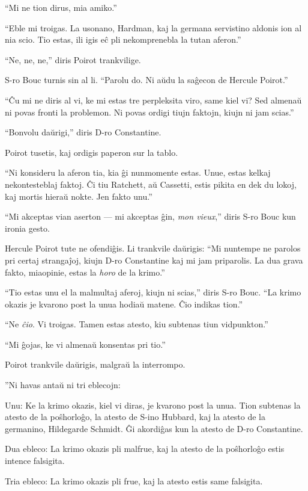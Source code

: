 ``Mi ne tion dirus, mia amiko.''

``Eble mi troigas. La usonano, Hardman, kaj la germana servistino aldonis ion al nia scio. Tio estas, ili igis eĉ pli nekomprenebla la tutan aferon.''

``Ne, ne, ne,'' diris Poirot trankvilige.

S-ro Bouc turnis sin al li. ``Parolu do. Ni aŭdu la saĝecon de Hercule Poirot.''

``Ĉu mi ne diris al vi, ke mi estas tre perpleksita viro, same kiel vi? Sed almenaŭ ni povas fronti la problemon. Ni povas ordigi tiujn faktojn, kiujn ni jam scias.''

``Bonvolu daŭrigi,'' diris D-ro Constantine.

Poirot tusetis, kaj ordigis paperon sur la tablo.

``Ni konsideru la aferon tia, kia ĝi nunmomente estas. Unue, estas kelkaj nekontesteblaj faktoj. Ĉi tiu Ratchett, aŭ Cassetti, estis pikita en dek du lokoj, kaj mortis hieraŭ nokte. Jen fakto unu.''

``Mi akceptas vian aserton --- mi akceptas ĝin, \emph{mon vieux},'' diris S-ro Bouc kun ironia gesto.

Hercule Poirot tute ne ofendiĝis. Li trankvile daŭrigis: ``Mi nuntempe ne parolos pri certaj strangaĵoj, kiujn D-ro Constantine kaj mi jam priparolis. La dua grava fakto, miaopinie, estas la \emph{horo} de la krimo.''

``Tio estas unu el la malmultaj aferoj, kiujn ni scias,'' diris S-ro Bouc. ``La krimo okazis je kvarono post la unua hodiaŭ matene. Ĉio indikas tion.''

``Ne \emph{ĉio}. Vi troigas. Tamen estas atesto, kiu subtenas tiun vidpunkton.''

``Mi ĝojas, ke vi almenaŭ konsentas pri tio.''

Poirot trankvile daŭrigis, malgraŭ la interrompo.

''Ni havas antaŭ ni tri eblecojn:

Unu: Ke la krimo okazis, kiel vi diras, je kvarono post la unua. Tion subtenas la atesto de la poŝhorloĝo, la atesto de S-ino Hubbard, kaj la atesto de la germanino, Hildegarde Schmidt. Ĝi akordiĝas kun la atesto de D-ro Constantine.

Dua ebleco: La krimo okazis pli malfrue, kaj la atesto de la poŝhorloĝo estis intence falsigita.

Tria ebleco: La krimo okazis pli frue, kaj la atesto estis same falsigita.

